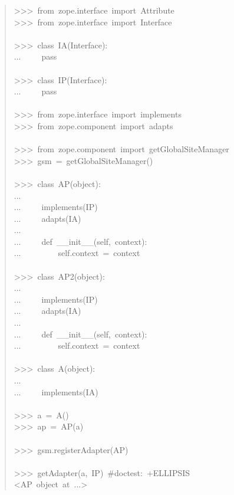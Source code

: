 \documentclass[a4paper,openany,twoside,final]{book}
\begin{document}
\begin{quote}{\ttfamily \raggedright \noindent
>{}>{}>~from~zope.interface~import~Attribute\\
>{}>{}>~from~zope.interface~import~Interface\\
~\\
>{}>{}>~class~IA(Interface):\\
...~~~~~pass\\
~\\
>{}>{}>~class~IP(Interface):\\
...~~~~~pass\\
~\\
>{}>{}>~from~zope.interface~import~implements\\
>{}>{}>~from~zope.component~import~adapts\\
~\\
>{}>{}>~from~zope.component~import~getGlobalSiteManager\\
>{}>{}>~gsm~=~getGlobalSiteManager()\\
~\\
>{}>{}>~class~AP(object):\\
...\\
...~~~~~implements(IP)\\
...~~~~~adapts(IA)\\
...\\
...~~~~~def~\_\_init\_\_(self,~context):\\
...~~~~~~~~~self.context~=~context\\
~\\
>{}>{}>~class~AP2(object):\\
...\\
...~~~~~implements(IP)\\
...~~~~~adapts(IA)\\
...\\
...~~~~~def~\_\_init\_\_(self,~context):\\
...~~~~~~~~~self.context~=~context\\
~\\
>{}>{}>~class~A(object):\\
...\\
...~~~~~implements(IA)\\
~\\
>{}>{}>~a~=~A()\\
>{}>{}>~ap~=~AP(a)\\
~\\
>{}>{}>~gsm.registerAdapter(AP)\\
~\\
>{}>{}>~getAdapter(a,~IP)~\#doctest:~+ELLIPSIS\\
<AP~object~at~...>
}
\end{quote}
\end{document}
